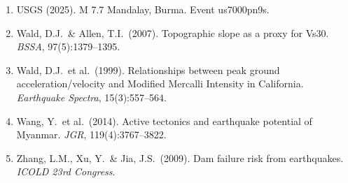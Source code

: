\documentclass[11pt,a4paper]{article}
\begin{document}
\begin{enumerate}
    \item USGS (2025). M 7.7 Mandalay, Burma. Event us7000pn9s.
    \item Wald, D.J.\ \& Allen, T.I.\ (2007). Topographic slope as a proxy for Vs30. \textit{BSSA}, 97(5):1379--1395.
    \item Wald, D.J.\ et al.\ (1999). Relationships between peak ground acceleration/velocity and Modified Mercalli Intensity in California. \textit{Earthquake Spectra}, 15(3):557--564.
    \item Wang, Y.\ et al.\ (2014). Active tectonics and earthquake potential of Myanmar. \textit{JGR}, 119(4):3767--3822.
    \item Zhang, L.M., Xu, Y.\ \& Jia, J.S.\ (2009). Dam failure risk from earthquakes. \textit{ICOLD 23rd Congress}.
\end{enumerate}
\end{document}
